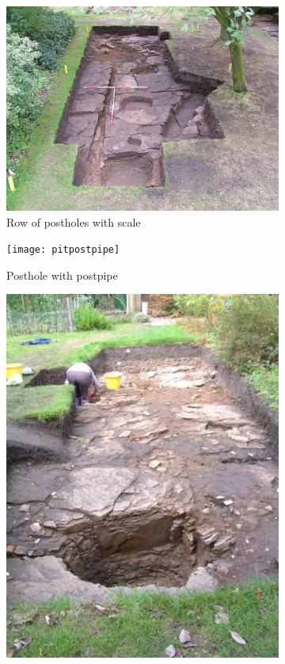\documentclass[letterpaper,11pt,titlepage]{article}
\begin{document}
{\begin{figure}
	\centering
	\begin{subfigure}[b]{0.30\textwidth}
		\includegraphics[width=\textwidth]{DSCF2859}
		\caption{Row of postholes with scale}
		\label{fig:postholes}
	\end{subfigure}
	\begin{subfigure}[b]{0.30\textwidth}
		\texttt{[image: pitpostpipe]}
		\caption{Posthole with postpipe}
		\label{fig:postpipe}
	\end{subfigure}
	\begin{subfigure}[b]{0.30\textwidth}
		\includegraphics[width=\textwidth]{Mellor_hall}

\end{subfigure}
\end{figure}}
\end{document}
